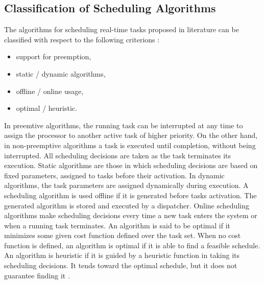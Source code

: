 \subsection{Classification of Scheduling Algorithms}
The algorithms for scheduling real-time tasks proposed in literature can be classified with respect to the following criterions \cite{buttazzo2011hard}:
\begin{itemize}
    \item support for preemption,
    \item static / dynamic algorithms,
    \item offline / online usage,
    \item optimal / heuristic.
\end{itemize}
In preemtive algorithms, the running task can be interrupted at any time to assign the processor to another active task of higher priority.
On the other hand, in non-preemptive algorithms a task is executed until completion, without being interrupted. 
All scheduling decisions are taken as the task terminates its execution.
Static algorithms are those in which scheduling decisions are based on fixed parameters, assigned to tasks before their activation.
In dynamic algorithms, the task parameters are assigned dynamically during execution.
A scheduling algorithm is used offline if it is generated before tasks activation. 
The generated algorithm is stored and executed by a dispatcher.
Online scheduling algorithms make scheduling decisions every time a new task enters the system or when a running task terminates.
An algorithm is said to be optimal if it minimizes some given cost function defined over the task set. 
When no cost function is defined, an algorithm is optimal if it is able to find a feasible schedule.
An algorithm is heuristic if it is guided by a heuristic function in taking its scheduling decisions. 
It tends toward the optimal schedule, but it does not guarantee finding it \cite{buttazzo2011hard}.

